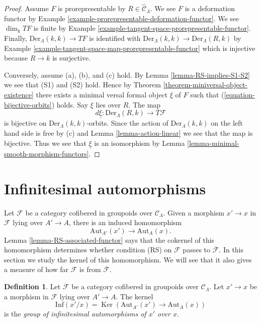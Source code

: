 \documentclass{stacks-project}
\theoremstyle{plain}
\theoremstyle{definition}
\newtheorem{definition}[subsection]{Definition}
\theoremstyle{remark}
\numberwithin{equation}{subsection}
\def\Ker{\mathop{\mathrm{Ker}}}
\begin{document}
\begin{proof}
Assume $F$ is prorepresentable by $R \in \widehat{\mathcal{C}}_\Lambda$.
We see $F$ is a deformation functor by
Example \ref{example-prorepresentable-deformation-functor}.
We see $\dim_k TF$ is finite by
Example \ref{example-tangent-space-prorepresentable-functor}.
Finally, $\text{Der}_\Lambda(k, k) \to TF$ is identified with
$\text{Der}_\Lambda(k, k) \to \text{Der}_\Lambda(R, k)$ by
Example \ref{example-tangent-space-map-prorepresentable-functor}
which is injective because $R \to k$ is surjective.

\medskip\noindent
Conversely, assume (a), (b), and (c) hold. By
Lemma \ref{lemma-RS-implies-S1-S2}
we see that (S1) and (S2) hold. Hence by
Theorem \ref{theorem-miniversal-object-existence}
there exists a minimal versal formal object $\xi$ of $F$ such that
(\ref{equation-bijective-orbits}) holds. Say $\xi$ lies over $R$.
The map
$$
d\underline{\xi} : \text{Der}_\Lambda(R, k) \to T\mathcal{F}
$$
is bijective on $\text{Der}_\Lambda(k, k)$-orbits. Since the action
of $\text{Der}_\Lambda(k, k)$ on the left hand side is free by (c) and
Lemma \ref{lemma-action-linear}
we see that the map is bijective. Thus we see that $\underline{\xi}$
is an isomorphism by
Lemma \ref{lemma-minimal-smooth-morphism-functors}.
\end{proof}




\section{Infinitesimal automorphisms}
\label{section-infinitesimal-automorphisms}

\noindent
Let $\mathcal{F}$ be a category cofibered in groupoids over
$\mathcal{C}_\Lambda$. Given a morphism $x' \to x$ in $\mathcal{F}$ lying over
$A' \to A$, there is an induced homomorphism
$$
\text{Aut}_{A'}(x') \to \text{Aut}_A(x).
$$
Lemma \ref{lemma-RS-associated-functor}
says that the cokernel of this homomorphism determines whether
condition (RS) on $\mathcal{F}$ passes to $\overline{\mathcal{F}}$.
In this section we study the kernel of this homomorphism. We will see
that it also gives a measure of how far $\mathcal{F}$
is from $\overline{\mathcal{F}}$.

\begin{definition}
\label{definition-relative-infinitesimal-auts}
Let $\mathcal{F}$ be a category cofibered in groupoids over $\mathcal
C_\Lambda$. Let $x' \to x$ be a morphism in $\mathcal{F}$ lying over
$A' \to A$. The kernel
$$
\text{Inf}(x'/x) = \Ker(\text{Aut}_{A'}(x') \to \text{Aut}_A(x))
$$
is the {\it group of infinitesimal automorphisms of $x'$ over $x$}.
\end{definition}
\end{document}
